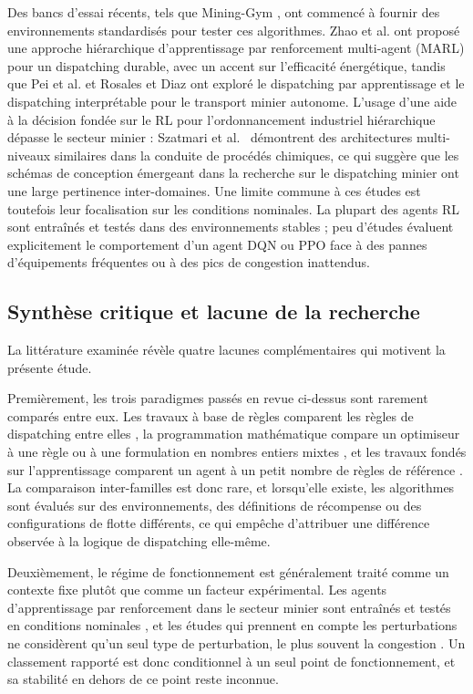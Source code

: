 \documentclass[11pt,a4paper]{article}
\begin{document}
Des bancs d'essai récents, tels que Mining-Gym \cite{Banerjee2025}, ont commencé à fournir des environnements standardisés pour tester ces algorithmes. Zhao et al. \cite{Zhao2025} ont proposé une approche hiérarchique d'apprentissage par renforcement multi-agent (MARL) pour un dispatching durable, avec un accent sur l'efficacité énergétique, tandis que Pei et al. \cite{Pei2025} et Rosales et Diaz \cite{FranciscoRosales2025} ont exploré le dispatching par apprentissage et le dispatching interprétable pour le transport minier autonome. L'usage d'une aide à la décision fondée sur le RL pour l'ordonnancement industriel hiérarchique dépasse le secteur minier : Szatmari et al.~\cite{KingaSzatmari2025} démontrent des architectures multi-niveaux similaires dans la conduite de procédés chimiques, ce qui suggère que les schémas de conception émergeant dans la recherche sur le dispatching minier ont une large pertinence inter-domaines. Une limite commune à ces études est toutefois leur focalisation sur les conditions nominales. La plupart des agents RL sont entraînés et testés dans des environnements stables ; peu d'études évaluent explicitement le comportement d'un agent DQN ou PPO face à des pannes d'équipements fréquentes ou à des pics de congestion inattendus.

\subsection{Synthèse critique et lacune de la recherche}
\label{sec:synthesis}

La littérature examinée révèle quatre lacunes complémentaires qui motivent la présente étude.

Premièrement, les trois paradigmes passés en revue ci-dessus sont rarement comparés entre eux. Les travaux à base de règles comparent les règles de dispatching entre elles \cite{Alarie2002, MehrnazMohtasham2023, Zeng2022}, la programmation mathématique compare un optimiseur à une règle ou à une formulation en nombres entiers mixtes \cite{Soumis1989, AmandaSmith2020}, et les travaux fondés sur l'apprentissage comparent un agent à un petit nombre de règles de référence \cite{deCarvalho2023, Zhao2025}. La comparaison inter-familles est donc rare, et lorsqu'elle existe, les algorithmes sont évalués sur des environnements, des définitions de récompense ou des configurations de flotte différents, ce qui empêche d'attribuer une différence observée à la logique de dispatching elle-même.

Deuxièmement, le régime de fonctionnement est généralement traité comme un contexte fixe plutôt que comme un facteur expérimental. Les agents d'apprentissage par renforcement dans le secteur minier sont entraînés et testés en conditions nominales \cite{deCarvalho2023, Hazrathosseini2024, Zhao2025}, et les études qui prennent en compte les perturbations ne considèrent qu'un seul type de perturbation, le plus souvent la congestion \cite{Zeng2022}. Un classement rapporté est donc conditionnel à un seul point de fonctionnement, et sa stabilité en dehors de ce point reste inconnue.
\end{document}
